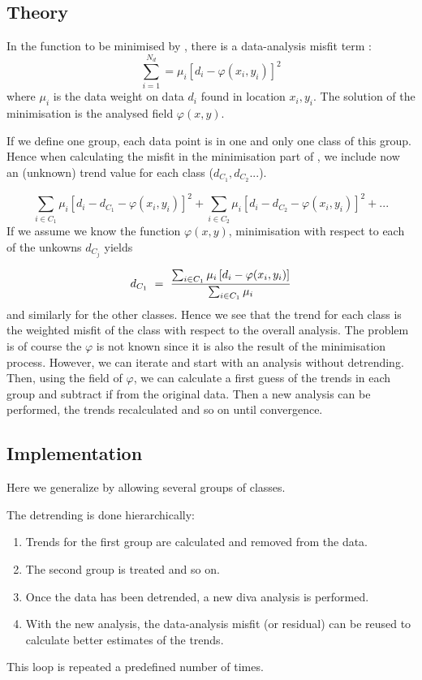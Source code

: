 \subsection{Theory}

In the function to be minimised by \diva, there is a data-analysis misfit term :
\begin{equation}
\sum_{i=1}^{N_{d}} =  \mu_i \left[ d_i - \varphi(x_i,y_i) \right]^2
\end{equation}
where $\mu_i$ is the data weight on data $d_i$ found in location $x_i,y_i$. The solution of the minimisation is the analysed field $\varphi(x,y)$.


If we define one group, each data point is in one and only one class of this group. Hence
when calculating the misfit in the minimisation part of \diva , we include now an (unknown) trend value for each class ($d_{C_1}, d_{C_2} ...$).

\begin{equation}
\sum_{i\in C_1} \mu_i \left[ d_i -d_{C_1}- \varphi(x_i,y_i) \right]^2 + \sum_{i\in C_2} \mu_i \left[ d_i -d_{C_2}- \varphi(x_i,y_i) \right]^2 + ...
\end{equation}
If we assume we know the function $\varphi(x,y)$, minimisation with respect to each of the unkowns $d_{C_j}$ yields


\begin{equation}
d_{C_1} ~=~{ \sum_{i\in C_1} \mu_i \left[ d_i - \varphi(x_i,y_i) \right] \over \sum_{i\in C_1} \mu_i }
\end{equation}
and similarly for the other classes. Hence we see that the trend for each class is the weighted misfit of the class with respect to the overall analysis.
The problem is of course the $\varphi$ is not known since it is also the result of the minimisation process. However, we can iterate and start with an analysis without detrending. Then, using the field of $\varphi$, we can calculate a first guess of the trends in each group and subtract if from the original data. 
Then a new analysis can be performed, the trends recalculated and so on until convergence.


\subsection{Implementation}

Here we generalize by allowing several groups of classes.

The detrending is done hierarchically:
\begin{enumerate}
\item Trends for the first group are calculated and removed from the data. 
\item The second group is treated and so on.
\item Once the data has been detrended, a new diva analysis is performed. 
\item With the new analysis, the data-analysis misfit (or residual) can be reused to
calculate better estimates of the trends. 
\end{enumerate}
This loop is repeated a predefined number of times. 

